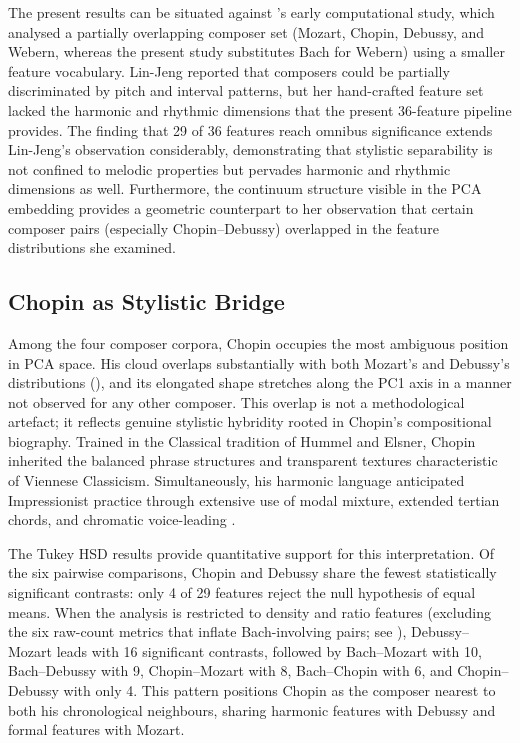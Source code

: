 \documentclass[]{interact}
\theoremstyle{plain}
\theoremstyle{definition}
\theoremstyle{remark}
\begin{document}
The present results can be situated against \citeauthor{LinJeng1987}'s
\citeyearpar{LinJeng1987} early computational study, which analysed a
partially overlapping composer set (Mozart, Chopin, Debussy, and Webern,
whereas the present study substitutes Bach for Webern) using a smaller
feature vocabulary. Lin-Jeng reported that composers could be partially
discriminated by pitch and interval patterns, but her hand-crafted feature
set lacked the harmonic and rhythmic dimensions that the present 36-feature
pipeline provides. The finding that 29 of 36 features reach omnibus
significance extends Lin-Jeng's observation considerably, demonstrating
that stylistic separability is not confined to melodic properties but
pervades harmonic and rhythmic dimensions as well. Furthermore, the
continuum structure visible in the PCA embedding provides a geometric
counterpart to her observation that certain composer pairs (especially
Chopin--Debussy) overlapped in the feature distributions she examined.

\subsection{Chopin as Stylistic Bridge}

Among the four composer corpora, Chopin occupies the most ambiguous position
in PCA space. His cloud overlaps substantially with both Mozart's and
Debussy's distributions (), and its elongated shape
stretches along the PC1 axis in a manner not observed for any other
composer. This overlap is not a methodological artefact; it reflects
genuine stylistic hybridity rooted in Chopin's compositional biography.
Trained in the Classical tradition of Hummel and Elsner, Chopin inherited
the balanced phrase structures and transparent textures characteristic of
Viennese Classicism. Simultaneously, his harmonic language anticipated
Impressionist practice through extensive use of modal mixture, extended
tertian chords, and chromatic voice-leading \citep{ChopinTransformations}.

The Tukey HSD results provide quantitative support for this interpretation.
Of the six pairwise comparisons, Chopin and Debussy share the fewest
statistically significant contrasts: only 4 of 29 features reject the null
hypothesis of equal means. When the analysis is restricted to density and
ratio features (excluding the six raw-count metrics that inflate
Bach-involving pairs; see ), Debussy--Mozart leads
with 16 significant contrasts, followed by Bach--Mozart with 10, Bach--Debussy
with 9, Chopin--Mozart with 8, Bach--Chopin with 6, and Chopin--Debussy
with only 4. This pattern positions Chopin as the
composer nearest to both his chronological neighbours, sharing harmonic
features with Debussy and formal features with Mozart.
\end{document}
